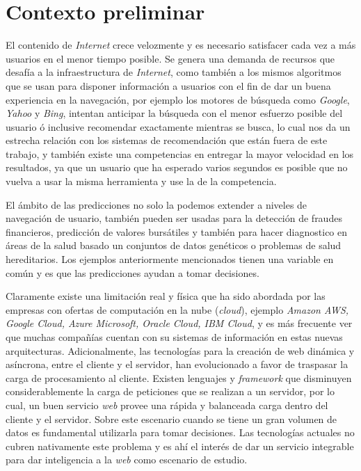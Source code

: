 \section{Contexto preliminar}\label{sec:preliminar}

	
	El contenido de \emph{Internet} crece velozmente y es necesario satisfacer cada vez a más usuarios en el menor tiempo posible. Se genera una demanda de recursos que desafía a la infraestructura de \emph{Internet}, como también a los mismos algoritmos que se usan para disponer información a usuarios con el fin de dar un buena experiencia en la navegación, por ejemplo los motores de búsqueda como \emph{Google}, \emph{Yahoo} y \emph{Bing}, intentan anticipar la búsqueda con el menor esfuerzo posible del usuario ó inclusive recomendar exactamente mientras se busca, lo cual nos da un estrecha relación con los sistemas de recomendación que están fuera de este trabajo, y también existe una competencias en entregar la mayor velocidad en los resultados, ya que un usuario que ha esperado varios segundos es posible que no vuelva a usar la misma herramienta y use la de la competencia.
	
	{El ámbito de las predicciones no solo la podemos extender a niveles de navegación de usuario, también pueden ser usadas para la detección de fraudes financieros, predicción de valores bursátiles y también para hacer diagnostico en áreas de la salud basado un conjuntos de datos genéticos o problemas de salud hereditarios. Los ejemplos anteriormente mencionados tienen una variable en común y es que las predicciones ayudan a tomar decisiones.}\label{ejemplos-casos-contextopreliminar}
	
	 Claramente existe una limitación real y física que ha sido abordada por las empresas con ofertas de computación en la nube (\emph{cloud}), ejemplo \emph{Amazon AWS, Google Cloud, Azure Microsoft, Oracle Cloud, IBM Cloud}, y es más frecuente ver que muchas compañías cuentan con su sistemas de información en estas nuevas arquitecturas. Adicionalmente, las tecnologías para la creación de web dinámica y asíncrona, entre el cliente y el servidor, han evolucionado a favor de traspasar la carga de procesamiento al cliente. Existen lenguajes y \emph{framework} que disminuyen considerablemente la carga de peticiones que se realizan a un servidor, por lo cual, un buen servicio \emph{web} provee una rápida y balanceada carga dentro del cliente y el servidor. Sobre este escenario cuando se tiene un gran volumen de datos es fundamental utilizarla para tomar decisiones. Las tecnologías actuales no cubren nativamente este problema y es ahí el interés de dar un servicio integrable para dar inteligencia a la \emph{web} como escenario de estudio.

